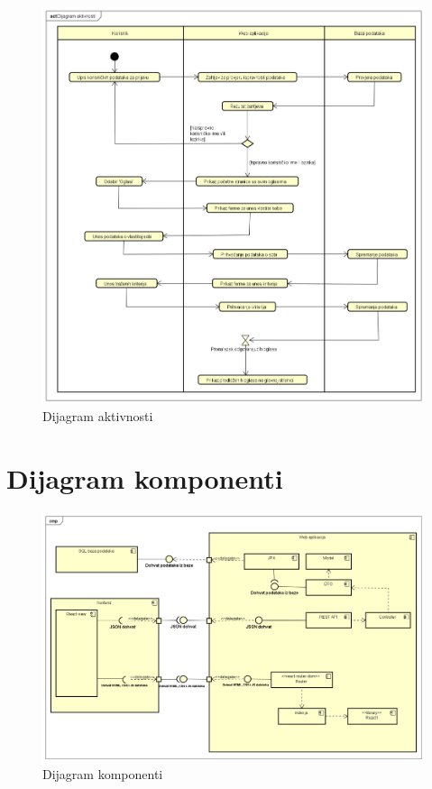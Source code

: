 		\begin{figure}[H]
			\includegraphics[scale=0.4]{dijagrami/dijagramAktivnosti} %
			\centering
			\caption{Dijagram aktivnosti}
			\label{fig:dijagramAktivnosti}
		\end{figure}
		
		\eject
		\section{Dijagram komponenti}
		
		
		
		\begin{figure}[H]
			\includegraphics[scale=0.4]{dijagrami/dijagramKomponenti} %
			\centering
			\caption{Dijagram komponenti}
			\label{fig:dijagramKomponenti}
		\end{figure}
		
		
